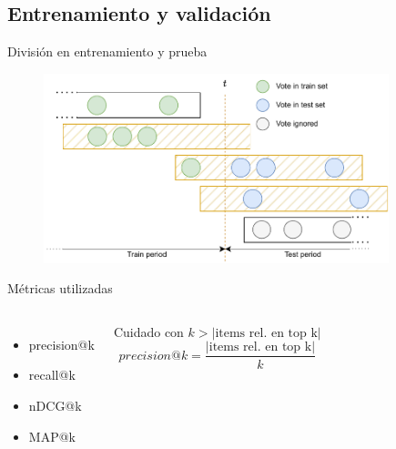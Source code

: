\subsection{Entrenamiento y validación}

\begin{frame}{División en entrenamiento y prueba}
    \begin{figure}
        \centering
        \includegraphics[height=55mm]{images/diagrams/rs-time-folds-evaluacion.drawio.pdf}
    \end{figure}
\end{frame}


\begin{frame}{Métricas utilizadas}   
\begin{columns}
    \begin{itemize}
        \item precision@k
        \item recall@k
        \item nDCG@k
        \item MAP@k
    \end{itemize}
    \pause
    \centering
    \begin{alertblock}{Cuidado con $k>\left|\text{items rel. en top k}\right|$}
    \begin{equation}
        precision@k=\frac{\left|\text{items rel. en top k}\right|}{k}
    \end{equation}
    \end{alertblock}
\end{columns}
\end{frame}

